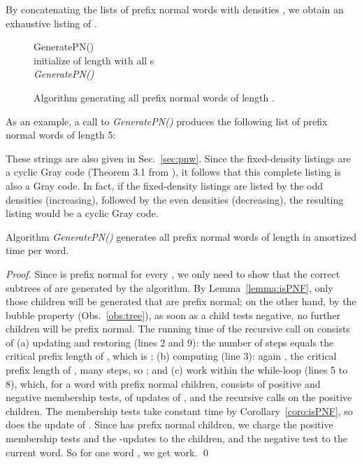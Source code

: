 \documentclass[11pt,a4paper]{llncs}
\begin{document}
\noindent  By concatenating the lists of prefix normal words with densities , we obtain an exhaustive listing of .


\begin{figure}
\begin{algorithm}{GeneratePN()}{
}
\qfor \\
\qdo initialize  of length  with all s\\
{\em GeneratePN()}
\qend
\end{algorithm}
\caption{Algorithm generating all prefix normal words of length .\label{algo:genPN2}}
\end{figure}

As an example, a call to {\em GeneratePN()} produces the following list of prefix normal words of length 5:
\small

\normalsize
These strings are also given in Sec.~\ref{sec:pnw}.  Since the fixed-density listings are a cyclic Gray code (Theorem 3.1 from \cite{RSW12}), it follows that this complete listing is also a Gray code.  In fact, if the fixed-density listings are listed by the odd densities (increasing), followed by the even densities (decreasing), the resulting listing would be a cyclic Gray code.



\begin{theorem}
Algorithm {\em GeneratePN()} generates all prefix normal words of length  in amortized  time per word. 
\end{theorem}

\begin{proof}
Since  is prefix normal for every , we only need to show that the correct subtrees of  are generated by the algorithm. By Lemma~\ref{lemma:isPNF}, only those children will be generated that are prefix normal; on the other hand, by the bubble property (Obs.~\ref{obs:tree}), as soon as a child tests negative, no further children will be prefix normal. The running time of the recursive call on  consists of (a) updating and restoring  (lines 2 and 9): the number of steps equals the critical prefix length of , which is ; (b) computing  (line 3): again , the critical prefix length of , many steps, so ; and (c) work within the while-loop (lines 5 to 8), which, for a word with  prefix normal children, consists of  positive and  negative membership tests, of  updates of , and the recursive calls on the positive children. The membership tests take constant time by Corollary~\ref{coro:isPNF}, so does the update of . Since  has  prefix normal children, we charge the positive membership tests and the -updates to the children, and the negative test to the current word.
So for one word , we get  work.
\hfill \qed 
\end{proof}
\end{document}
